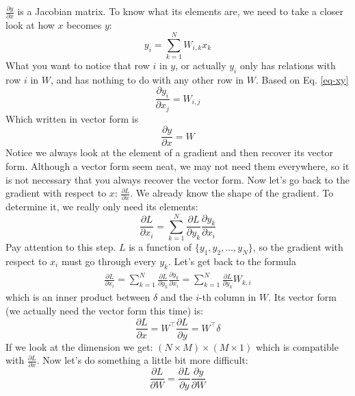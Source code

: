 \documentclass{article}
\begin{document}
$\frac{\partial y}{\partial x}$ is a Jacobian matrix. To know what its elements are, we need to take a closer look at how $x$ becomes $y$:
\begin{equation} \label{eq-xy}
    y_i = \sum_{k=1}^NW_{i, k}x_k
\end{equation}
What you want to notice that row $i$ in $y$, or actually $y_i$ only has relations with row $i$ in $W$, and has nothing to do with any other row in $W$. Based on Eq. \eqref{eq-xy}
\begin{equation}
    \frac{\partial y_i}{\partial x_j} = W_{i, j}
\end{equation}
Which written in vector form is
\begin{equation}
    \frac{\partial y}{\partial x} = W
\end{equation}
Notice we always look at the element of a gradient and then recover its vector form. Although a vector form seem neat, we may not need them everywhere, so it is not necessary that you always recover the vector form. Now let's go back to the gradient with respect to $x$: $\frac{\partial L}{\partial x}$. We already know the shape of the gradient. To determine it, we really only need its elements:
\begin{equation}
    \frac{\partial L}{\partial x_i} = \sum_{k=1}^N\frac{\partial L}{\partial y_k}\frac{\partial y_k}{\partial x_i}
\end{equation}
Pay attention to this step. $L$ is a function of $\{y_1, y_2, \dots, y_N\}$, so the gradient with respect to $x_i$ must go through every $y_k$. Let's get back to the formula
\begin{align}
    \frac{\partial L}{\partial x_i} = \sum_{k=1}^N\frac{\partial L}{\partial y_k}\frac{\partial y_k}{\partial x_i} = \sum_{k=1}^N\frac{\partial L}{\partial y_k}W_{k, i}
\end{align}
which is an inner product between $\delta$ and the $i$-th column in $W$. Its vector form (we actually need the vector form this time) is:
\begin{equation}
    \frac{\partial L}{\partial x} 
    = W^\top\frac{\partial L}{\partial y} = W^\top\delta
\end{equation}
If we look at the dimension we get: $(N\times M) \times (M \times 1)$ which is compatible with $\frac{\partial L}{\partial x}$. 
Now let's do something a little bit more difficult:
\begin{equation}
    \frac{\partial L}{\partial W} = \frac{\partial L}{\partial y}\frac{\partial y}{\partial W}
\end{equation}
\end{document}
